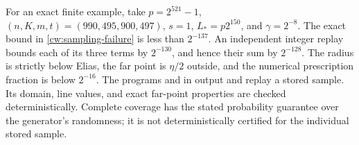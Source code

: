 For an exact finite example, take $p=2^{521}-1$,
$(n,K,m,t)=(990,495,900,497)$, $s=1$, $L_*=p2^{150}$, and
$\gamma=2^{-8}$. The exact bound in \eqref{cw:sampling-failure} is
less than $2^{-137}$. An independent integer replay bounds each of
its three terms by $2^{-130}$, and hence their sum by $2^{-128}$.
The radius is strictly below Elias, the far point is $\eta/2$ outside,
and the numerical prescription fraction is below $2^{-16}$.
The programs  and  in
 output and replay a stored sample.
Its domain, line values, and exact far-point properties are checked
deterministically. Complete coverage has the stated probability guarantee
over the generator's randomness; it is not deterministically certified
for the individual stored sample.
